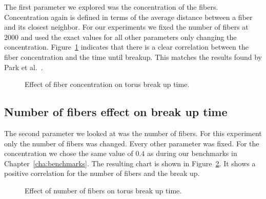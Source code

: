 The first parameter we explored was the concentration of the fibers. Concentration again is defined in terms of the average distance between a fiber and its closest neighbor. For our experiments we fixed the number of fibers at $2000$ and used the exact values for all other parameters only changing the concentration. Figure~\ref{fig:concentration_breakup} indicates that there is a clear correlation between the fiber concentration and the time until breakup. This matches the results found by Park et al.~\cite{Park2010}.

\begin{figure}[!htbp]
  \centering
  \caption{Effect of fiber concentration on torus break up time.}
  \label{fig:concentration_breakup}
\end{figure}

\subsection{Number of fibers effect on break up time}

The second parameter we looked at was the number of fibers. For this experiment only the number of fibers was changed. Every other parameter was fixed. For the concentration we chose the same value of $0.4$ as during our benchmarks in Chapter~\ref{cha:benchmarks}. The resulting chart is shown in Figure~\ref{fig:number_breakup}. It shows a positive correlation for the number of fibers and the break up.

\begin{figure}[!htbp]
  \centering
  \caption{Effect of number of fibers on torus break up time.}
  \label{fig:number_breakup}
\end{figure}

